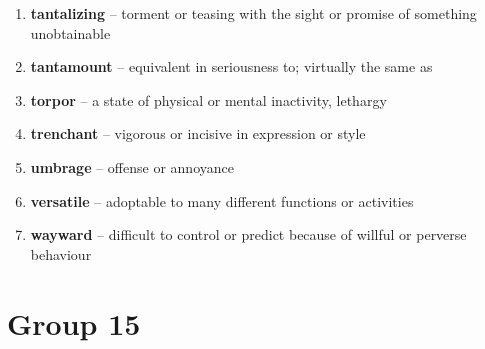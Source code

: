 \begin{enumerate}[wide,labelindent=0pt]
\item \textbf{tantalizing} -- torment or teasing with the sight or promise of something unobtainable
\item \textbf{tantamount} -- equivalent in seriousness to; virtually the same as
\item \textbf{torpor} -- a state of physical or mental inactivity, lethargy
\item \textbf{trenchant} -- vigorous or incisive in expression or style
\item \textbf{umbrage} -- offense or annoyance
\item \textbf{versatile} -- adoptable to many different functions or activities
\item \textbf{wayward} -- difficult to control or predict because of willful or perverse behaviour
\end{enumerate}

\newpage
\section{Group 15}

